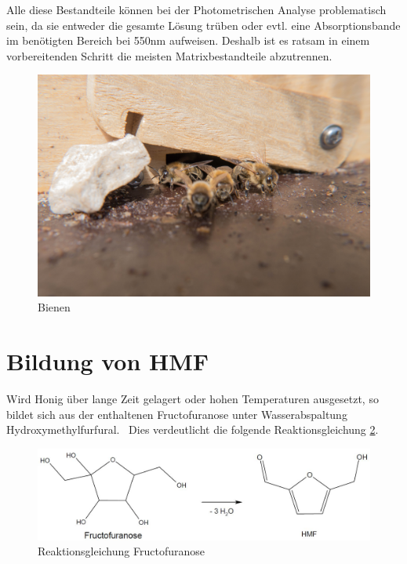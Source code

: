 Alle diese Bestandteile können bei der Photometrischen Analyse problematisch sein, da sie entweder die gesamte Lösung trüben oder evtl. eine Absorptionsbande im benötigten Bereich bei 550nm aufweisen. Deshalb ist es ratsam in einem vorbereitenden Schritt die meisten Matrixbestandteile abzutrennen.~\cite{LWG}
\begin{figure}[htbp]
	\centering
		\includegraphics[width=1.00\textwidth]{../Bilder/P1050729.jpg}
	\caption{Bienen}
	\label{fig:Bienen}
\end{figure}


\section{Bildung von HMF}

Wird Honig über lange Zeit gelagert oder hohen Temperaturen ausgesetzt, so bildet sich aus der enthaltenen Fructofuranose unter Wasserabspaltung Hydroxymethylfurfural.~\cite{HMF} Dies verdeutlicht die folgende Reaktionsgleichung \ref{fig:HMFEntstehung}. 
  
\begin{figure}[htbp]
	\centering
		\includegraphics[width=1.00\textwidth]{../Bilder/HMFEntstehung.JPG}
	\caption{Reaktionsgleichung Fructofuranose}
	\label{fig:HMFEntstehung}
\end{figure}

